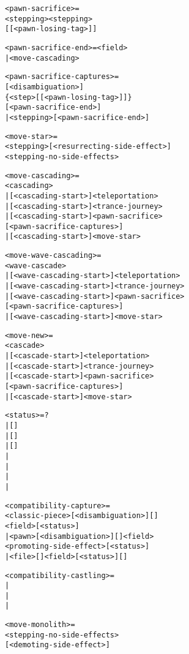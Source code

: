 \clearpage %

\begin{alltt}
<pawn-sacrifice> =
  <stepping><stepping>
    [\alg{*}[<pawn-losing-tag>]]\alg{;;}

<pawn-sacrifice-end> = \alg{|}<field>
                     | <move-cascading>

<pawn-sacrifice-captures> =
  [<disambiguation>]
    \{<step>[\alg{*}[<pawn-losing-tag>]]\}
    [<pawn-sacrifice-end>]
| <stepping>[<pawn-sacrifice-end>]

<move-star> =
  <stepping>[<resurrecting-side-effect>]
    \alg{~}<stepping-no-side-effects>

<move-cascading> =
  <cascading>
| [<cascading-start>]<teleportation>
| [<cascading-start>]<trance-journey>
| [<cascading-start>]<pawn-sacrifice>
    [<pawn-sacrifice-captures>]
| [<cascading-start>]<move-star>

<move-wave-cascading> =
  <wave-cascade>
| [<wave-cascading-start>]<teleportation>
| [<wave-cascading-start>]<trance-journey>
| [<wave-cascading-start>]<pawn-sacrifice>
    [<pawn-sacrifice-captures>]
| [<wave-cascading-start>]<move-star>
\end{alltt}

\clearpage %

\begin{alltt}
<move-new> =
  <cascade>
| [<cascade-start>\alg{~}]<teleportation>
| [<cascade-start>\alg{~}]<trance-journey>
| [<cascade-start>\alg{~}]<pawn-sacrifice>
    [<pawn-sacrifice-captures>]
| [<cascade-start>\alg{~}]<move-star>

<status> = ?
         | [\alg{+}]
         | [\alg{+}]\alg{(=)}
         | [\alg{+}]\alg{(-)}
         | \alg{#}
         | \algcty{++}
         | \alg{(=)}
         | \alg{(-)}

<compatibility-capture> =
  <classic-piece>[<disambiguation>][]
    <field>[<status>]
| <pawn>[<disambiguation>][]<field>
    <promoting-side-effect>[<status>]
| <file>[]<field>[<status>][]

<compatibility-castling> =
| 
| 
| 

<move-monolith> =
  <stepping-no-side-effects>
  [<demoting-side-effect>]
\end{alltt}

\clearpage %

